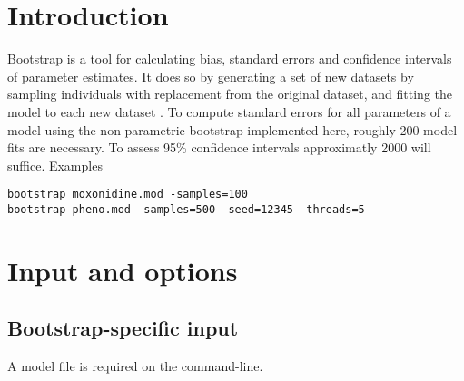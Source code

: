 


\maketitle


\section{Introduction}

Bootstrap is a tool for calculating bias, standard errors and confidence intervals of parameter estimates. It does so by generating a set of new datasets by sampling individuals with replacement from the original dataset, and fitting the model to each new dataset \cite{Efron}. To compute standard errors for all parameters of a model using the non-parametric bootstrap implemented here, roughly 200 model fits are necessary. To assess 95\% confidence intervals approximatly 2000 will suffice.
Examples
\begin{verbatim}
bootstrap moxonidine.mod -samples=100
bootstrap pheno.mod -samples=500 -seed=12345 -threads=5
\end{verbatim}

\section{Input and options}

\subsection{Bootstrap-specific input}
A model file is required on the command-line.

